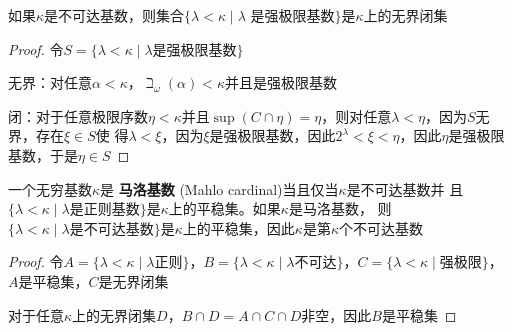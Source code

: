 \documentclass[11pt]{article}
\begin{document}
\begin{exercise}[3.4.21]
如果\(\kappa\)是不可达基数，则集合\(\{\lambda<\kappa\mid\lambda\text{ 是强极限基数}\}\)是\(\kappa\)上的无界闭集
\end{exercise}

\begin{proof}
令\(S=\{\lambda<\kappa\mid\lambda\text{是强极限基数}\}\)

无界：对任意\(\alpha<\kappa\)，\(\beth_\omega(\alpha)<\kappa\)并且是强极限基数

闭：对于任意极限序数\(\eta<\kappa\)并且\(\sup(C\cap\eta)=\eta\)，则对任意\(\lambda<\eta\)，因为\(S\)无界，存在\(\xi\in S\)使
得\(\lambda<\xi\)，因为\(\xi\)是强极限基数，因此\(2^\lambda<\xi<\eta\)，因此\(\eta\)是强极限基数，于是\(\eta\in S\)
\end{proof}

\begin{exercise}
一个无穷基数\(\kappa\)是 \textbf{马洛基数} (Mahlo cardinal)当且仅当\(\kappa\)是不可达基数并
且\(\{\lambda<\kappa\mid\lambda\text{是正则基数}\}\)是\(\kappa\)上的平稳集。如果\(\kappa\)是马洛基数，
则\(\{\lambda<\kappa\mid\lambda\text{是不可达基数}\}\)是\(\kappa\)上的平稳集，因此\(\kappa\)是第\(\kappa\)个不可达基数
\end{exercise}

\begin{proof}
令\(A=\{\lambda<\kappa\mid\lambda\text{正则}\}\)，\(B=\{\lambda<\kappa\mid\lambda\text{不可达}\}\)，\(C=\{\lambda<\kappa\mid\text{强极限}\}\)，\(A\)是平稳集，\(C\)是无界闭集

对于任意\(\kappa\)上的无界闭集\(D\)，\(B\cap D=A\cap C\cap D\)非空，因此\(B\)是平稳集
\end{proof}
\end{document}
